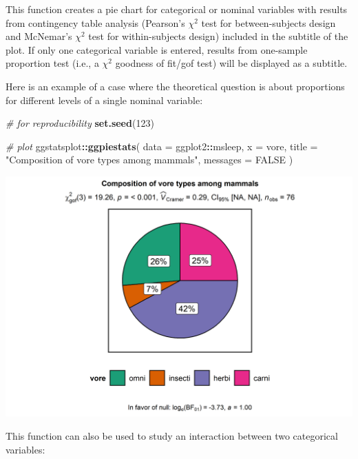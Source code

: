 \documentclass[
]{article}
\newenvironment{Shaded}{\begin{snugshade}}{\end{snugshade}}
\newcommand{\CommentTok}[1]{\textcolor[rgb]{0.56,0.35,0.01}{\textit{#1}}}
\newcommand{\DataTypeTok}[1]{\textcolor[rgb]{0.13,0.29,0.53}{#1}}
\newcommand{\DecValTok}[1]{\textcolor[rgb]{0.00,0.00,0.81}{#1}}
\newcommand{\KeywordTok}[1]{\textcolor[rgb]{0.13,0.29,0.53}{\textbf{#1}}}
\newcommand{\NormalTok}[1]{#1}
\newcommand{\OperatorTok}[1]{\textcolor[rgb]{0.81,0.36,0.00}{\textbf{#1}}}
\newcommand{\OtherTok}[1]{\textcolor[rgb]{0.56,0.35,0.01}{#1}}
\newcommand{\StringTok}[1]{\textcolor[rgb]{0.31,0.60,0.02}{#1}}
\begin{document}
This function creates a pie chart for categorical or nominal variables with
results from contingency table analysis (Pearson's \(\chi^2\) test for
between-subjects design and McNemar's \(\chi^2\) test for within-subjects design)
included in the subtitle of the plot. If only one categorical variable is
entered, results from one-sample proportion test (i.e., a \(\chi^2\) goodness of
fit/gof test) will be displayed as a subtitle.

Here is an example of a case where the theoretical question is about proportions
for different levels of a single nominal variable:

\begin{Shaded}
\begin{Highlighting}[]
\CommentTok{\# for reproducibility}
\KeywordTok{set.seed}\NormalTok{(}\DecValTok{123}\NormalTok{)}

\CommentTok{\# plot}
\NormalTok{ggstatsplot}\OperatorTok{::}\KeywordTok{ggpiestats}\NormalTok{(}
  \DataTypeTok{data =}\NormalTok{ ggplot2}\OperatorTok{::}\NormalTok{msleep,}
  \DataTypeTok{x =}\NormalTok{ vore,}
  \DataTypeTok{title =} \StringTok{"Composition of vore types among mammals"}\NormalTok{,}
  \DataTypeTok{messages =} \OtherTok{FALSE}
\NormalTok{)}
\end{Highlighting}
\end{Shaded}

\includegraphics[width=1\linewidth]{./figures/paper-ggpiestats1-1}

This function can also be used to study an interaction between two categorical
variables:
\end{document}
